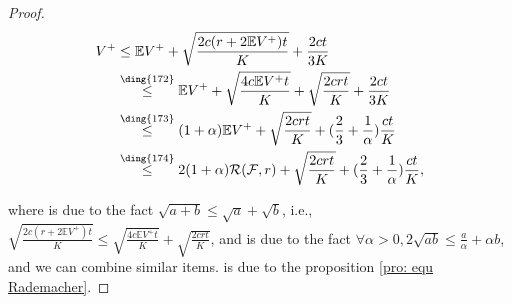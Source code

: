 \documentclass{article}
\def\eE{\mathbb{E}}
\def\leqone{\overset{\text{\ding{172}}}{\leq}}
\def\leqtwo{\overset{\text{\ding{173}}}{\leq}}
\def\leqthree{\overset{\text{\ding{174}}}{\leq}}
\begin{document}
\begin{proof}
\begin{align*}
    V^+ & \leq \eE V^+ + \sqrt{\frac{2c(r + 2\eE V^+) t}{K}} +\frac{2ct}{3K} \\
    & \leqone \eE V^+ +\sqrt {\frac{4c \eE V^+ t}{K}} + \sqrt {\frac{2crt}{K}} + \frac{2ct}{3K} \\
    & \leqtwo (1+\alpha) \eE V^+ + \sqrt {\frac{2crt}{K}} + (\frac{2}{3} + \frac{1}{\alpha})\frac{ct}{K} \\  
    & \leqthree 2(1 + \alpha) \mathcal{R} (\mathcal{F} , r) + \sqrt {\frac{2crt}{K}} + (\frac{2}{3} + \frac{1}{\alpha})\frac{ct}{K}, \\
\end{align*}

where  is due to the fact $\sqrt{a + b} \leq \sqrt{a} + \sqrt{b}$, i.e., $\sqrt{\frac{2c(r + 2\eE V^+) t}{K}} \leq \sqrt {\frac{4c \eE V^+ t}{K}} + \sqrt {\frac{2crt}{K}} $, and  is due to the fact $\forall \alpha > 0, 2 \sqrt{ab} \leq \frac{a}{\alpha} + \alpha b$,  and we can combine similar items.  is due to  the proposition \ref{pro: equ Rademacher}. 
\end{proof}
\end{document}
